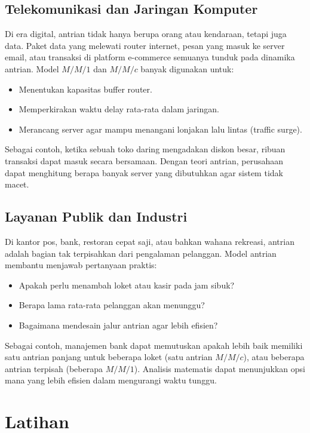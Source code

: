 \documentclass{bukumjh}
\begin{document}
\subsection{Telekomunikasi dan Jaringan Komputer}

Di era digital, antrian tidak hanya berupa orang atau kendaraan, tetapi juga {\jsg data}. Paket data yang melewati router internet, pesan yang masuk ke server email, atau transaksi di platform e-commerce semuanya tunduk pada dinamika antrian. Model $M/M/1$ dan $M/M/c$ banyak digunakan untuk:
\begin{itemize}
    \item Menentukan kapasitas buffer router.
    \item Memperkirakan waktu delay rata-rata dalam jaringan.
    \item Merancang server agar mampu menangani lonjakan lalu lintas (traffic surge).
\end{itemize}

Sebagai contoh, ketika sebuah toko daring mengadakan diskon besar, ribuan transaksi dapat masuk secara bersamaan. Dengan teori antrian, perusahaan dapat menghitung berapa banyak server yang dibutuhkan agar sistem tidak macet.

\subsection{Layanan Publik dan Industri}

Di kantor pos, bank, restoran cepat saji, atau bahkan wahana rekreasi, antrian adalah bagian tak terpisahkan dari pengalaman pelanggan. Model antrian membantu menjawab pertanyaan praktis:
\begin{itemize}
    \item Apakah perlu menambah loket atau kasir pada jam sibuk?
    \item Berapa lama rata-rata pelanggan akan menunggu?
    \item Bagaimana mendesain jalur antrian agar lebih efisien?
\end{itemize}

Sebagai contoh, manajemen bank dapat memutuskan apakah lebih baik memiliki satu antrian panjang untuk beberapa loket (satu antrian $M/M/c$), atau beberapa antrian terpisah (beberapa $M/M/1$). Analisis matematis dapat menunjukkan opsi mana yang lebih efisien dalam mengurangi waktu tunggu.

\section{Latihan}
\end{document}
